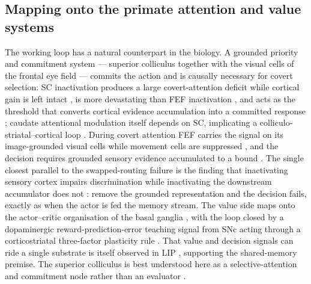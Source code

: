 \subsection{Mapping onto the primate attention and value systems}
The working loop has a natural counterpart in the biology. A grounded priority and commitment system --- superior colliculus together with the visual cells of the frontal eye field --- commits the action and is causally necessary for covert selection: SC inactivation produces a large covert-attention deficit while cortical gain is left intact \citep{zenon2012attention, lovejoy2010inactivation}, is more devastating than FEF inactivation \citep{bollimunta2018fefsc}, and acts as the threshold that converts cortical evidence accumulation into a committed response \citep{stine2023differential}; caudate attentional modulation itself depends on SC, implicating a colliculo-striatal--cortical loop \citep{herman2020attention}. During covert attention FEF carries the signal on its image-grounded visual cells while movement cells are suppressed \citep{thompson2005neuronal, moore2001control, moore2004microstimulation}, and the decision requires grounded sensory evidence accumulated to a bound \citep{gold2007neural}. The single closest parallel to the swapped-routing failure is the finding that inactivating sensory cortex impairs discrimination while inactivating the downstream accumulator does not \citep{katz2016dissociated}: remove the grounded representation and the decision fails, exactly as when the actor is fed the memory stream. The value side maps onto the actor--critic organisation of the basal ganglia \citep{odoherty2004dissociable, maia2009reinforcement}, with the loop closed by a dopaminergic reward-prediction-error teaching signal from SNc \citep{schultz1997neural, hollerman1998dopamine} acting through a corticostriatal three-factor plasticity rule \citep{morita2014striatal}. That value and decision signals can ride a single substrate is itself observed in LIP \citep{platt1999neural, sugrue2004matching}, supporting the shared-memory premise. The superior colliculus is best understood here as a selective-attention and commitment node rather than an evaluator \citep{krauzlis2018selective}.

